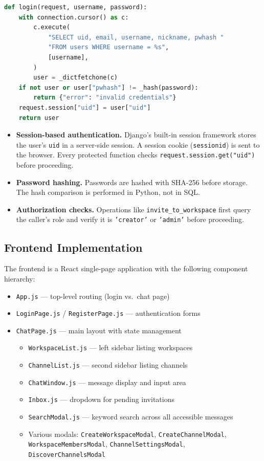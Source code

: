 \documentclass[11pt]{article}
\begin{document}
\begin{lstlisting}[language=Python]
def login(request, username, password):
    with connection.cursor() as c:
        c.execute(
            "SELECT uid, email, username, nickname, pwhash "
            "FROM users WHERE username = %s",
            [username],
        )
        user = _dictfetchone(c)
    if not user or user["pwhash"] != _hash(password):
        return {"error": "invalid credentials"}
    request.session["uid"] = user["uid"]
    return user
\end{lstlisting}

\begin{itemize}
    \item \textbf{Session-based authentication.} Django's built-in session framework stores the user's \texttt{uid} in a server-side session. A session cookie (\texttt{sessionid}) is sent to the browser. Every protected function checks \texttt{request.session.get("uid")} before proceeding.
    \item \textbf{Password hashing.} Passwords are hashed with SHA-256 before storage. The hash comparison is performed in Python, not in SQL.
    \item \textbf{Authorization checks.} Operations like \texttt{invite\_to\_workspace} first query the caller's role and verify it is \texttt{'creator'} or \texttt{'admin'} before proceeding.
\end{itemize}

\subsection{Frontend Implementation}

The frontend is a React single-page application with the following component hierarchy:

\begin{itemize}
    \item \texttt{App.js} --- top-level routing (login vs.\ chat page)
    \item \texttt{LoginPage.js} / \texttt{RegisterPage.js} --- authentication forms
    \item \texttt{ChatPage.js} --- main layout with state management
    \begin{itemize}
        \item \texttt{WorkspaceList.js} --- left sidebar listing workspaces
        \item \texttt{ChannelList.js} --- second sidebar listing channels
        \item \texttt{ChatWindow.js} --- message display and input area
        \item \texttt{Inbox.js} --- dropdown for pending invitations
        \item \texttt{SearchModal.js} --- keyword search across all accessible messages
        \item Various modals: \texttt{CreateWorkspaceModal}, \texttt{CreateChannelModal}, \texttt{WorkspaceMembersModal}, \texttt{ChannelSettingsModal}, \texttt{DiscoverChannelsModal}
    \end{itemize}
\end{itemize}
\end{document}
